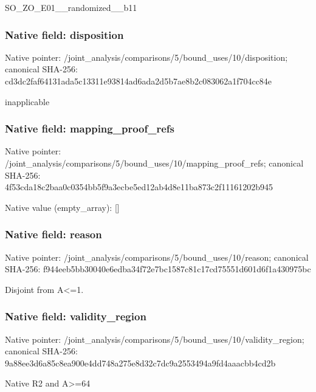 \documentclass[10pt,a4paper]{article}
\begin{document}
\begingroup\raggedright\sloppy SO\_\allowbreak{}ZO\_\allowbreak{}E01\_\allowbreak{}\_\allowbreak{}randomized\_\allowbreak{}\_\allowbreak{}b11\par\endgroup

\subsubsection{Native field: disposition}
Native pointer: /joint\_\allowbreak{}analysis/comparisons/5/bound\_\allowbreak{}uses/10/disposition; canonical SHA-256: cd3dc2faf64131ada5c13311e93814ad6ada2d5b7ae8b2c083062a1f704cc84e

\begingroup\raggedright\sloppy inapplicable\par\endgroup

\subsubsection{Native field: mapping\_\allowbreak{}proof\_\allowbreak{}refs}
Native pointer: /joint\_\allowbreak{}analysis/comparisons/5/bound\_\allowbreak{}uses/10/mapping\_\allowbreak{}proof\_\allowbreak{}refs; canonical SHA-256: 4f53cda18c2baa0c0354bb5f9a3ecbe5ed12ab4d8e11ba873c2f11161202b945

Native value (empty\_\allowbreak{}array): []

\subsubsection{Native field: reason}
Native pointer: /joint\_\allowbreak{}analysis/comparisons/5/bound\_\allowbreak{}uses/10/reason; canonical SHA-256: f944eeb5bb30040e6edba34f72e7bc1587c81c17cd75551d601d6f1a430975bc

\begingroup\raggedright\sloppy Disjoint from A<=\allowbreak{}1.\par\endgroup

\subsubsection{Native field: validity\_\allowbreak{}region}
Native pointer: /joint\_\allowbreak{}analysis/comparisons/5/bound\_\allowbreak{}uses/10/validity\_\allowbreak{}region; canonical SHA-256: 9a88ee3d6a85c8ea900e4dd748a275e8d32c7dc9a2553494a9fd4aaacbb4cd2b

\begingroup\raggedright\sloppy Native R2 and A>=\allowbreak{}64\par\endgroup
\end{document}
